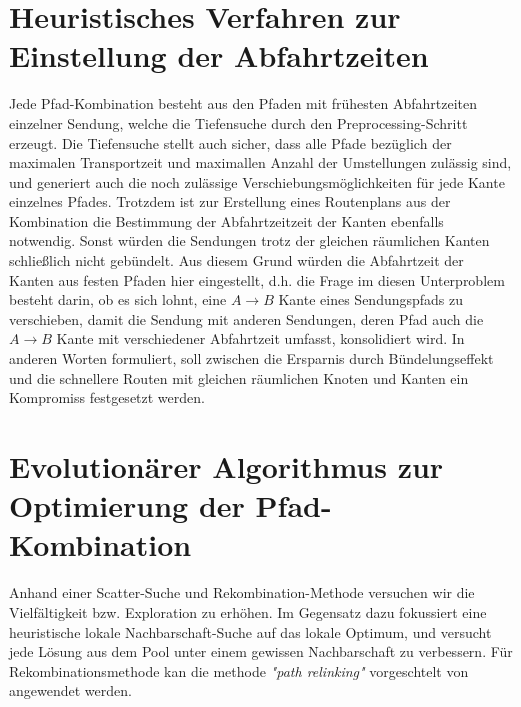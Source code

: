 \section{Heuristisches Verfahren zur Einstellung der Abfahrtzeiten}
Jede Pfad-Kombination besteht aus den Pfaden mit frühesten Abfahrtzeiten einzelner Sendung, welche die Tiefensuche durch den Preprocessing-Schritt erzeugt.  Die Tiefensuche stellt auch sicher, dass alle Pfade bezüglich der maximalen Transportzeit und maximallen Anzahl der Umstellungen zulässig sind, und generiert auch die noch zulässige Verschiebungsmöglichkeiten für jede Kante einzelnes Pfades. Trotzdem ist zur Erstellung eines Routenplans aus der Kombination die Bestimmung der Abfahrtzeitzeit der Kanten ebenfalls notwendig. Sonst würden die Sendungen trotz der gleichen räumlichen Kanten schließlich nicht gebündelt. Aus diesem Grund würden die Abfahrtzeit der Kanten aus festen Pfaden hier eingestellt, d.h. die Frage im diesen Unterproblem besteht darin, ob es sich lohnt, eine \(A\to B\) Kante eines Sendungspfads zu verschieben, damit die Sendung mit anderen Sendungen, deren Pfad auch die \(A\to B\) Kante mit verschiedener Abfahrtzeit umfasst, konsolidiert wird. In anderen Worten formuliert, soll zwischen die Ersparnis durch Bündelungseffekt und die schnellere Routen mit gleichen räumlichen Knoten und Kanten ein Kompromiss festgesetzt werden.\\



\section{Evolutionärer Algorithmus zur Optimierung der Pfad-Kombination}
Anhand einer Scatter-Suche und Rekombination-Methode versuchen wir die Vielfältigkeit bzw. Exploration zu erhöhen. Im Gegensatz dazu fokussiert eine heuristische lokale Nachbarschaft-Suche auf das lokale Optimum, und versucht jede Lösung aus dem Pool unter einem gewissen Nachbarschaft zu verbessern. Für Rekombinationsmethode kan die methode \emph{"path relinking"} vorgeschtelt von \cite{glover2003scatter} angewendet werden.\\
